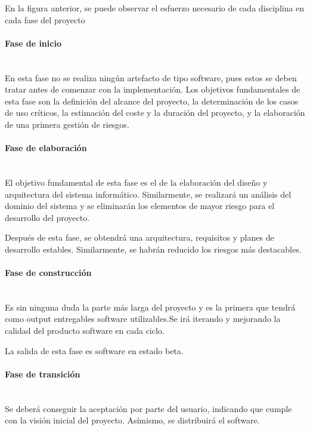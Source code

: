 \documentclass[twoside]{report}
\begin{document}
En la figura anterior, se puede observar el esfuerzo necesario de cada disciplina en cada fase del proyecto

\paragraph{Fase de inicio}\mbox{}\\

En esta fase no se realiza ningún artefacto de tipo software, pues estos se deben tratar antes de comenzar con la implementación. Los objetivos fundamentales de esta fase son la definición del alcance del proyecto,  la determinación de los casos de uso críticos, la estimación del coste y la duración del proyecto, y la elaboración de una primera gestión de riesgos.

\paragraph{Fase de elaboración}\mbox{}\\

El objetivo fundamental de esta fase \cite{pgpup} es el de la elaboración del diseño y arquitectura del sistema informático. Similarmente, se realizará un análisis del dominio del sistema y se eliminarán los elementos de mayor riesgo para el desarrollo del proyecto.

Después de esta fase, se obtendrá una arquitectura, requisitos y planes de desarrollo estables. Similarmente, se habrán reducido los riesgos más destacables.

\paragraph{Fase de construcción}\mbox{}\\

Es sin ninguna duda la parte más larga del proyecto y es la primera que tendrá como output entregables software utilizables.Se irá iterando y mejorando la calidad del producto software en cada ciclo.

La salida de esta fase \cite{pgpup} es software en estado beta.

\paragraph{Fase de transición}\mbox{}\\

Se deberá conseguir la aceptación por parte del usuario, indicando que cumple con la visión inicial del proyecto. Asímismo, se distribuirá el software.
\end{document}
